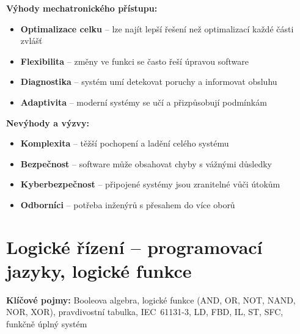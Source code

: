 \documentclass[a4paper,10pt]{article}
\begin{document}
\begin{vysvetlenibox}
\textbf{Výhody mechatronického přístupu:}
\begin{itemize}[noitemsep, leftmargin=1.4em, topsep=4pt]
    \item \textbf{Optimalizace celku} -- lze najít lepší řešení než optimalizací každé části zvlášť
    \item \textbf{Flexibilita} -- změny ve funkci se často řeší úpravou software
    \item \textbf{Diagnostika} -- systém umí detekovat poruchy a informovat obsluhu
    \item \textbf{Adaptivita} -- moderní systémy se učí a přizpůsobují podmínkám
\end{itemize}

\textbf{Nevýhody a výzvy:}
\begin{itemize}[noitemsep, leftmargin=1.4em, topsep=4pt]
    \item \textbf{Komplexita} -- těžší pochopení a ladění celého systému
    \item \textbf{Bezpečnost} -- software může obsahovat chyby s vážnými důsledky
    \item \textbf{Kyberbezpečnost} -- připojené systémy jsou zranitelné vůči útokům
    \item \textbf{Odborníci} -- potřeba inženýrů s přesahem do více oborů
\end{itemize}
\end{vysvetlenibox}

\section{Logické řízení -- programovací jazyky, logické funkce}

\begin{pojmybox}
\textbf{Klíčové pojmy:}
Booleova algebra, logické funkce (AND, OR, NOT, NAND, NOR, XOR),
pravdivostní tabulka, IEC~61131-3, LD, FBD, IL, ST, SFC,
funkčně úplný systém
\end{pojmybox}
\end{document}
